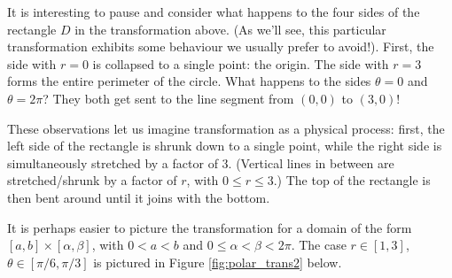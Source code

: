 \medskip

It is interesting to pause and consider what happens to the four sides of the rectangle $D$ in the transformation above. (As we'll see, this particular transformation exhibits some behaviour we usually prefer to avoid!). First, the
side with $r=0$ is collapsed to a single point: the origin. The side with $r=3$ forms the entire perimeter of the circle. What happens to the sides $\theta=0$ and $\theta=2\pi$? They both get sent to the line segment from $(0,0)$ to $(3,0)$! 

These observations let us imagine transformation as a physical process: first, the left side of the rectangle is shrunk down to a single point, while the right side is simultaneously stretched by a factor of 3. (Vertical lines in between are stretched/shrunk by a factor of $r$, with $0\leq r\leq 3$.) The top of the rectangle is then bent around until it joins with the bottom.

It is perhaps easier to picture the transformation for a domain of the form $[a,b]\times [\alpha,\beta]$, with $0<a< b$ and $0\leq \alpha<\beta< 2\pi$. The case $r\in [1,3]$, $\theta\in [\pi/6, \pi/3]$ is pictured in Figure \ref{fig:polar_trans2} below.\pagebreak

